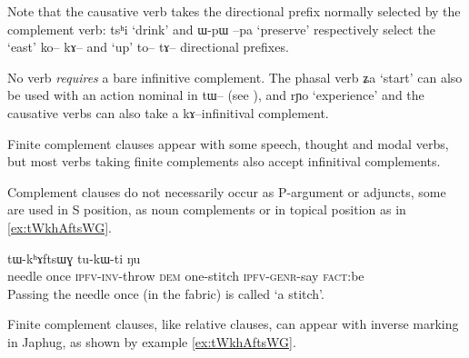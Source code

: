 \documentclass[oldfontcommands,oneside,a4paper,11pt]{article}
\newcommand{\ipa}[1]{{\phon #1}} %
\begin{document}
Note that the causative verb takes the directional prefix normally selected by the complement verb: \ipa{tsʰi} `drink' and \ipa{ɯ-pɯ} \ipa{--pa} `preserve'  respectively select the `east' \ipa{ko-- kɤ--} and `up' \ipa{to-- tɤ--} directional prefixes.

No verb \textit{requires} a bare infinitive complement. The phasal verb \ipa{ʑa} `start' can also be used with an action nominal in \ipa{tɯ--} (see \citealt[6-9]{jacques14antipassive}), and \ipa{rɲo} `experience' and the causative verbs can also take a \ipa{kɤ--}infinitival complement.

Finite complement clauses appear with some speech, thought and modal verbs, but most verbs taking finite complements also accept infinitival complements.

Complement clauses do not necessarily occur as P-argument or adjuncts, some are used in S position, as noun complements or in topical position as in \ref{ex:tWkhAftsWG}.


 \begin{exe}
\ex \label{ex:tWkhAftsWG}
\gll
[\ipa{taqaβ} 	\ipa{ci} 	\ipa{cʰɯ́-wɣ-lɤt}] 	\ipa{nɯ} 	\ipa{tɯ-kʰɤftsɯɣ} 	\ipa{tu-kɯ-ti} 	\ipa{ŋu} \\
needle once \textsc{ipfv-inv}-throw \textsc{dem} one-stitch \textsc{ipfv-genr}-say \textsc{fact}:be \\
\glt Passing the needle once (in the fabric) is called `a stitch'.
\end{exe}

Finite complement clauses, like relative clauses, can appear with inverse marking in Japhug, as shown by example \ref{ex:tWkhAftsWG}.
\end{document}

